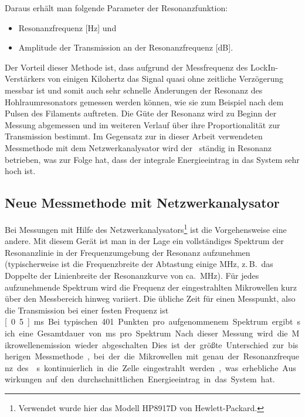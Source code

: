 Daraus erhält man folgende Parameter der Resonanzfunktion:
\begin{itemize}
	\item Resonanzfrequenz [Hz] und
	\item Amplitude der Transmission an der Resonanzfrequenz [dB].
\end{itemize}
Der Vorteil dieser Methode ist, dass aufgrund der Messfrequenz des LockIn-Verstärkers von einigen Kilohertz das Signal quasi ohne zeitliche Verzögerung messbar ist und somit auch sehr schnelle Änderungen der Resonanz des Hohlraumresonators gemessen werden können, wie sie zum Beispiel nach dem Pulsen des Filaments auftreten. Die Güte der Resonanz wird zu Beginn der Messung abgemessen und im weiteren Verlauf über ihre Proportionalität zur Transmission bestimmt. Im Gegensatz zur in dieser Arbeit verwendeten Messmethode mit dem Netzwerkanalysator wird der \HR\ ständig in Resonanz betrieben, was zur Folge hat, dass der integrale Energieeintrag in das System sehr hoch ist.

\subsection{Neue Messmethode mit Netzwerkanalysator}
\label{ssec:new_method}
Bei Messungen mit Hilfe des Netzwerkanalysators\footnote{Verwendet wurde hier das Modell HP8917D von Hewlett-Packard.} ist die Vorgehensweise eine andere. Mit diesem Gerät ist man in der Lage ein vollständiges Spektrum der Resonanzlinie in der Frequenzumgebung der Resonanz aufzunehmen (typischerweise ist die Frequenzbreite der Abtastung einige MHz,  z.\,B.\ das Doppelte der Linienbreite der Resonanzkurve von ca.\ \unit[10]{MHz}). Für jedes aufzunehmende Spektrum wird die Frequenz der eingestrahlten Mikrowellen kurz über den Messbereich hinweg variiert. Die übliche Zeit für einen Messpunkt, also die Transmission bei einer festen Frequenz ist \unit[0.5]{ms}. Bei typischen 401 Punkten pro aufgenommenem Spektrum ergibt sich eine Gesamtdauer von \unit[200]{ms} pro Spektrum. Nach dieser Messung wird die Mikrowellenemission wieder abgeschalten. Dies ist der größte Unterschied zur bisherigen Messmethode, bei der die Mikrowellen mit genau der Resonanzfrequenz des \HR{}s kontinuierlich in die Zelle eingestrahlt werden, was erhebliche Auswirkungen auf den durchschnittlichen Energieeintrag in das System hat.
	
